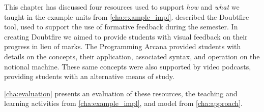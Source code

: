 This chapter has discussed four resources used to support \emph{how} and \emph{what} we taught in the example units from \cref{cha:example_impl}.  described the Doubtfire tool, used to support the use of formative feedback during the semester. In creating Doubtfire we aimed to provide students with visual feedback on their progress in lieu of marks. The Programming Arcana provided students with details on the concepts, their application, associated syntax, and operation on the notional machine. These same concepts were also supported by video podcasts, providing students with an alternative means of study.

\cref{cha:evaluation} presents an evaluation of these resources, the teaching and learning activities from \cref{cha:example_impl}, and model from \cref{cha:approach}.



